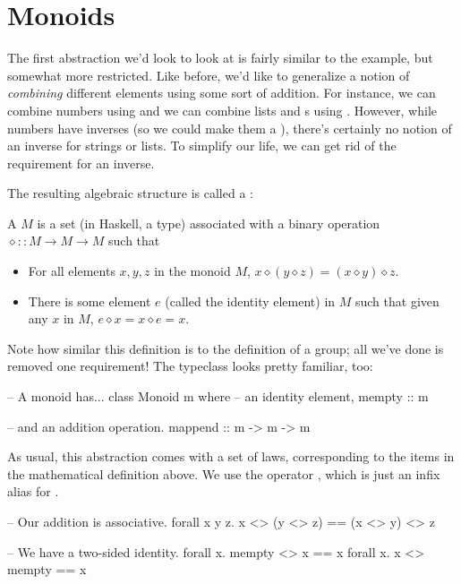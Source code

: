 \section{Monoids}
\label{sec:monoids}
The first abstraction we'd look to look at is fairly similar to the  example, but
somewhat more restricted. Like before, we'd like to generalize a notion of \emph{combining}
different elements using some sort of addition. For instance, we can combine numbers using
\inline{+} and we can combine lists and s using \inline{++}. However, while numbers
have inverses (so we could make them a ), there's certainly no notion of an inverse
for strings or lists. To simplify our life, we can get rid of the requirement for an inverse.

The resulting algebraic structure is called a :
\begin{definition}
    A  $M$ is a set (in Haskell, a type) associated with a binary
    operation $\diamond :: M \to M \to M$ such that
    \begin{itemize}
        \item For all elements $x, y, z$ in the monoid $M$, $x \diamond (y \diamond z) = (x \diamond y) \diamond z$.
        \item There is some element $e$ (called the identity element) in $M$ such that given any $x$
            in $M$, $e \diamond x = x \diamond e = x$.
    \end{itemize}
\end{definition}
Note how similar this definition is to the definition of a group; all we've done is removed one
requirement! The typeclass looks pretty familiar, too:
\begin{haskell}
-- A monoid has...
class Monoid m where
  -- an identity element,
  mempty :: m

  -- and an addition operation.
  mappend :: m -> m -> m
\end{haskell}

As usual, this abstraction comes with a set of laws, corresponding to the items in the mathematical
definition above. We use the operator \inline{<>}, which is just an infix alias for .
\begin{haskell}
-- Our addition is associative.
forall x y z. x <> (y <> z) == (x <> y) <> z

-- We have a two-sided identity.
forall x. mempty <> x == x
forall x. x <> mempty == x
\end{haskell}

